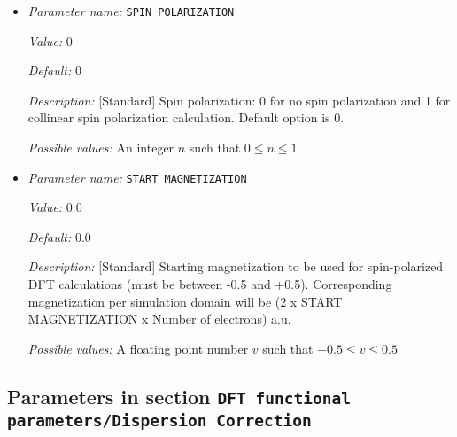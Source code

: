 \begin{itemize}
{\it Value:} 15.0


{\it Default:} 15.0


{\it Description:} [Standard] Distance from the domain till which periodic images will be considered for the local part of the pseudopotential. Units in a.u. 


{\it Possible values:} A floating point number $v$ such that $-\text{MAX\_DOUBLE} \leq v \leq \text{MAX\_DOUBLE}$
\item {\it Parameter name:} {\tt SPIN POLARIZATION}
\label{parameters:DFT functional parameters/SPIN POLARIZATION}
\label{parameters:DFT_20functional_20parameters/SPIN_20POLARIZATION}


{\it Value:} 0


{\it Default:} 0


{\it Description:} [Standard] Spin polarization: 0 for no spin polarization and 1 for collinear spin polarization calculation. Default option is 0.


{\it Possible values:} An integer $n$ such that $0\leq n \leq 1$
\item {\it Parameter name:} {\tt START MAGNETIZATION}
\label{parameters:DFT functional parameters/START MAGNETIZATION}
\label{parameters:DFT_20functional_20parameters/START_20MAGNETIZATION}


{\it Value:} 0.0


{\it Default:} 0.0


{\it Description:} [Standard] Starting magnetization to be used for spin-polarized DFT calculations (must be between -0.5 and +0.5). Corresponding magnetization per simulation domain will be (2 x START MAGNETIZATION x Number of electrons) a.u. 


{\it Possible values:} A floating point number $v$ such that $-0.5 \leq v \leq 0.5$
\end{itemize}



\subsection{Parameters in section \tt DFT functional parameters/Dispersion Correction}
\label{parameters:DFT_20functional_20parameters/Dispersion_20Correction}

